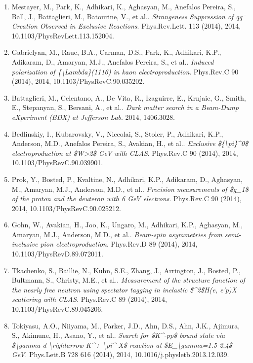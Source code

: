 \begin{enumerate}
\item Mestayer, M., Park, K., Adhikari, K., Aghasyan, M., Anefalos Pereira, S., Ball, J., Battaglieri, M., Batourine, V., et al.. \textit{Strangeness Suppression of qq¯ Creation Observed in Exclusive Reactions}. Phys.Rev.Lett. 113 (2014), 2014, 10.1103/PhysRevLett.113.152004.
\item Gabrielyan, M., Raue, B.A., Carman, D.S., Park, K., Adhikari, K.P., Adikaram, D., Amaryan, M.J., Anefalos Pereira, S., et al.. \textit{Induced polarization of \{\textbackslash{}Lambda\}(1116) in kaon electroproduction}. Phys.Rev.C 90 (2014), 2014, 10.1103/PhysRevC.90.035202.
\item Battaglieri, M., Celentano, A., De Vita, R., Izaguirre, E., Krnjaic, G., Smith, E., Stepanyan, S., Bersani, A., et al.. \textit{Dark matter search in a Beam-Dump eXperiment (BDX) at Jefferson Lab}. 2014, 1406.3028.
\item Bedlinskiy, I., Kubarovsky, V., Niccolai, S., Stoler, P., Adhikari, K.P., Anderson, M.D., Anefalos Pereira, S., Avakian, H., et al.. \textit{Exclusive \$\{\textbackslash{}pi\}\textasciicircum{}0\$ electroproduction at \$W>2\$ GeV with CLAS}. Phys.Rev.C 90 (2014), 2014, 10.1103/PhysRevC.90.039901.
\item Prok, Y., Bosted, P., Kvaltine, N., Adhikari, K.P., Adikaram, D., Aghasyan, M., Amaryan, M.J., Anderson, M.D., et al.. \textit{Precision measurements of \$g\_1\$ of the proton and the deuteron with 6 GeV electrons}. Phys.Rev.C 90 (2014), 2014, 10.1103/PhysRevC.90.025212.
\item Gohn, W., Avakian, H., Joo, K., Ungaro, M., Adhikari, K.P., Aghasyan, M., Amaryan, M.J., Anderson, M.D., et al.. \textit{Beam-spin asymmetries from semi-inclusive pion electroproduction}. Phys.Rev.D 89 (2014), 2014, 10.1103/PhysRevD.89.072011.
\item Tkachenko, S., Baillie, N., Kuhn, S.E., Zhang, J., Arrington, J., Bosted, P., Bultmann, S., Christy, M.E., et al.. \textit{Measurement of the structure function of the nearly free neutron using spectator tagging in inelastic \$\textasciicircum{}2\$H(e, e'p)X scattering with CLAS}. Phys.Rev.C 89 (2014), 2014, 10.1103/PhysRevC.89.045206.
\item Tokiyasu, A.O., Niiyama, M., Parker, J.D., Ahn, D.S., Ahn, J.K., Ajimura, S., Akimune, H., Asano, Y., et al.. \textit{Search for \$K\textasciicircum{}-pp\$ bound state via \$\textbackslash{}gamma d \textbackslash{}rightarrow K\textasciicircum{}+ \textbackslash{}pi\textasciicircum{}-X\$ reaction at \$E\_\textbackslash{}gamma=1.5-2.4\$ GeV}. Phys.Lett.B 728 616 (2014), 2014, 10.1016/j.physletb.2013.12.039.

\end{enumerate}
